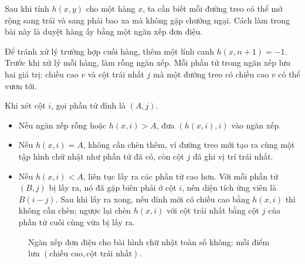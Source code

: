 \documentclass[11pt]{article}
\begin{document}
Sau khi tính \(h(x,y)\) cho một hàng \(x\), ta cần biết mỗi đường treo có thể
mở rộng sang trái và sang phải bao xa mà không gặp chướng ngại. Cách làm trong
bài này là duyệt hàng ấy bằng một ngăn xếp đơn điệu.

Để tránh xử lý trường hợp cuối hàng, thêm một lính canh \(h(x,n+1)=-1\). Trước
khi xử lý mỗi hàng, làm rỗng ngăn xếp. Mỗi phần tử trong ngăn xếp lưu hai giá
trị: chiều cao \(v\) và cột trái nhất \(j\) mà một đường treo có chiều cao
\(v\) có thể vươn tới.

Khi xét cột \(i\), gọi phần tử đỉnh là \((A,j)\).
\begin{itemize}
  \item Nếu ngăn xếp rỗng hoặc \(h(x,i)>A\), đưa \((h(x,i),i)\) vào ngăn xếp.
  \item Nếu \(h(x,i)=A\), không cần chèn thêm, vì đường treo mới tạo ra cùng
  một tập hình chữ nhật như phần tử đã có, còn cột \(j\) đã ghi vị trí trái
  nhất.
  \item Nếu \(h(x,i)<A\), liên tục lấy ra các phần tử cao hơn. Với mỗi phần
  tử \((B,j)\) bị lấy ra, nó đã gặp biên phải ở cột \(i\), nên diện tích ứng
  viên là \(B(i-j)\). Sau khi lấy ra xong, nếu đỉnh mới có chiều cao bằng
  \(h(x,i)\) thì không cần chèn; ngược lại chèn \(h(x,i)\) với cột trái nhất
  bằng cột \(j\) của phần tử cuối cùng vừa bị lấy ra.
\end{itemize}

\begin{figure}[ht]
\centering
{}
\caption{Ngăn xếp đơn điệu cho bài hình chữ nhật toàn số không: mỗi điểm lưu
\((\text{chiều cao},\text{cột trái nhất})\).}
\end{figure}
\end{document}
